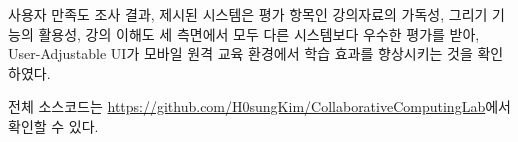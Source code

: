 \documentclass[pdflatex,sn-mathphys-num]{sn-jnl}%
\theoremstyle{thmstyleone}%
\theoremstyle{thmstyletwo}%
\theoremstyle{thmstylethree}%
\begin{document}
사용자 만족도 조사 결과, 제시된 시스템은 평가 항목인 강의자료의 가독성, 그리기 기능의 활용성, 강의 이해도 세 측면에서 모두 다른 시스템보다 우수한 평가를 받아, User-Adjustable UI가 모바일 원격 교육 환경에서 학습 효과를 향상시키는 것을 확인하였다.

전체 소스코드는 \url{https://github.com/H0sungKim/CollaborativeComputingLab}에서 확인할 수 있다.



\end{document}
